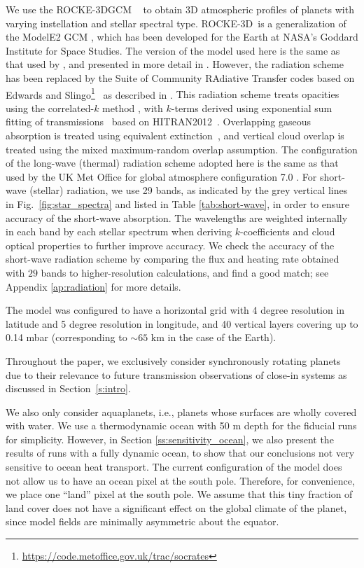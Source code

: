 \documentclass[11pt,numberedappendix,twocolappendix,]{emulateapj}
\def\modelE{ROCKE-3D}
\newcommand{\dsa}[1]{{\color{blue}#1}}
\begin{document}
We use \dsa{the \modelE GCM} \ \citep{Way2017} to obtain \dsa{3D} atmospheric profiles of \dsa{planets with varying instellation and stellar spectral type}. 
\modelE \ is a generalization \dsa{of the ModelE2 GCM} \citep{Schmidt2014}, which has been developed for the Earth at NASA's Goddard Institute for Space Studies. 
%
The version of the model used here is the same as that used by \citet{Way2016}, and presented in more detail in \citet{Way2017}.
However, the radiation scheme has been replaced by the \dsa{Suite of Community RAdiative Transfer codes based on Edwards and Slingo}\footnote{\url{https://code.metoffice.gov.uk/trac/socrates}}~\citep[SOCRATES,][]{EdwardsSlingo1996,Edwards1996} as described in \citet{Way2017}. 
\dsa{This radiation scheme treats opacities using the correlated-$k$ method \citep{Lacis1991,Goody1989}, with $k$-terms derived using exponential sum fitting of transmissions~\citep{Wiscombe1977} based on HITRAN2012~\citep{Rothman2013}.
Overlapping gaseous absorption is treated using equivalent extinction~\citep{Edwards1996,Amundsen2016}, and vertical cloud overlap is treated using the mixed maximum-random overlap assumption.}
The configuration of the long-wave (thermal) radiation scheme adopted here is the same as that used by the UK Met Office for global atmosphere configuration 7.0 \citep[GA7.0;][]{Walters2017}. 
For short-wave (stellar) radiation, we use 29 bands, as indicated by the \dsa{grey} vertical lines in Fig.~\ref{fig:star_spectra} and \dsa{listed} in Table \ref{tab:short-wave}, in order to ensure accuracy of the short-wave absorption. 
The wavelengths are weighted internally in each band by each stellar spectrum when deriving $k$-coefficients and cloud optical properties to further improve accuracy. 
We check the accuracy of the \dsa{short-wave} radiation \dsa{scheme} by comparing the \dsa{flux and heating rate} obtained \dsa{with $29$ bands to} higher-resolution calculations, and find a good match; see Appendix \ref{ap:radiation} for more details. 

The model was configured to have \dsa{a horizontal grid} with 4 degree resolution in latitude and 5 degree resolution in longitude, and 40 vertical layers covering up to 0.14 mbar (corresponding to $\sim 65$ km in the case of the Earth). 

Throughout the paper, we \dsa{exclusively} consider synchronously rotating planets \dsa{due to} their relevance \dsa{to future} transmission observations of close-in systems \dsa{as discussed in Section~\ref{s:intro}}. 

We \dsa{also only consider} aquaplanets, i.e., planets whose surfaces are wholly covered with water. 
We use a thermodynamic ocean with 50 m depth for the fiducial runs for simplicity. 
However, in Section \ref{ss:sensitivity_ocean}, we also present the results \dsa{of runs} with \dsa{a} fully dynamic ocean, to show that \dsa{our conclusions} not very sensitive to ocean heat transport. 
The current configuration of the model does not allow us to have an ocean pixel at the south pole. Therefore, for convenience, we place \dsa{one} ``land'' pixel at the south pole. We assume that this tiny fraction of land cover does not have a significant effect on the global climate of the planet, since model fields are minimally asymmetric about the equator. 
\end{document}
